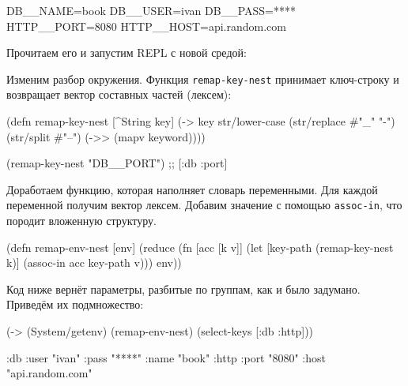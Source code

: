 \begin{english}
  \begin{bash}
DB__NAME=book
DB__USER=ivan
DB__PASS=****
HTTP__PORT=8080
HTTP__HOST=api.random.com
  \end{bash}
\end{english}


\noindent
Прочитаем его и запустим REPL с новой средой:

\begin{english}
\end{english}

\mnoindent
Изменим разбор окружения. Функция \texttt{remap\--key\--nest} принимает ключ-строку и
возвращает вектор составных частей (лексем):

\begin{english}
  \begin{clojure}
(defn remap-key-nest
  [^String key]
  (-> key
      str/lower-case
      (str/replace #"_" "-")
      (str/split #"--")
      (->> (mapv keyword))))

(remap-key-nest "DB__PORT")
;; [:db :port]
  \end{clojure}
\end{english}


Доработаем функцию, которая наполняет словарь переменными. Для каждой переменной
получим вектор лексем. Добавим значение с помощью \verb|assoc-in|, что породит
вложенную структуру.

\begin{english}
  \begin{clojure}
(defn remap-env-nest
  [env]
  (reduce
   (fn [acc [k v]]
     (let [key-path (remap-key-nest k)]
       (assoc-in acc key-path v)))
   {}
   env))
  \end{clojure}
\end{english}

Код ниже вернёт параметры, разбитые по группам, как и было задумано. Приведём их
подмножество:

\ifnarrow

\begin{english}
  \begin{clojure}
(-> (System/getenv)
    (remap-env-nest)
    (select-keys [:db :http]))

{:db {:user "ivan"
      :pass "****"
      :name "book"}
 :http {:port "8080"
        :host "api.random.com"}}
  \end{clojure}
\end{english}

